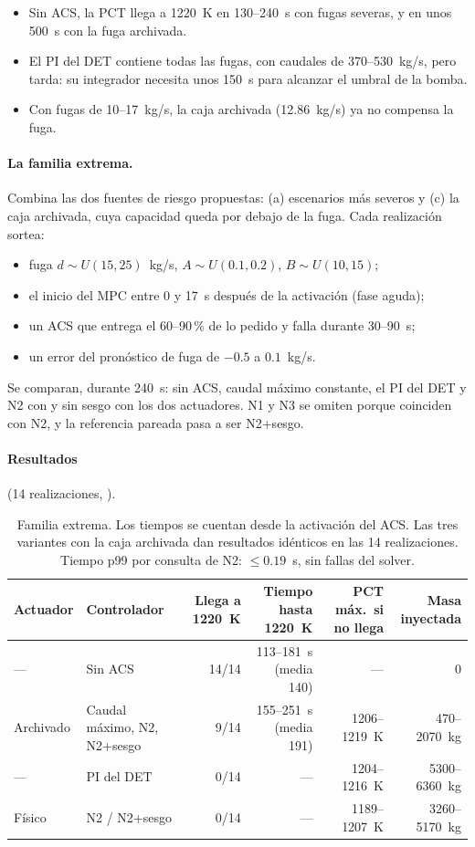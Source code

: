 \begin{itemize}
  \item Sin ACS, la PCT llega a 1220~K en 130--240~s con fugas severas, y en unos 500~s con
        la fuga archivada.
  \item El PI del DET contiene todas las fugas, con caudales de 370--530~kg/s, pero tarda:
        su integrador necesita unos 150~s para alcanzar el umbral de la bomba.
  \item Con fugas de 10--17~kg/s, la caja archivada (12.86~kg/s) ya no compensa la fuga.
\end{itemize}

\paragraph{La familia extrema.} Combina las dos fuentes de riesgo propuestas: (a)
escenarios más severos y (c) la caja archivada, cuya capacidad queda por debajo de la fuga.
Cada realización sortea:
\begin{itemize}
  \item fuga $d\sim U(15,25)$~kg/s, $A\sim U(0.1,0.2)$, $B\sim U(10,15)$;
  \item el inicio del MPC entre 0 y 17~s después de la activación (fase aguda);
  \item un ACS que entrega el 60--90\,\% de lo pedido y falla durante 30--90~s;
  \item un error del pronóstico de fuga de $-0.5$ a $0.1$~kg/s.
\end{itemize}
Se comparan, durante 240~s: sin ACS, caudal máximo constante, el PI del DET y N2 con y sin
sesgo con los dos actuadores. N1 y N3 se omiten porque coinciden con N2, y la referencia
pareada pasa a ser N2+sesgo.

\paragraph{Resultados} (14 realizaciones, ).

\begin{table}[H]\centering\footnotesize\setlength{\tabcolsep}{4pt}
\begin{tabularx}{\linewidth}{@{}l Y r r r r@{}}\toprule
Actuador & Controlador & Llega a 1220~K & Tiempo hasta 1220~K & PCT máx.\ si no llega & Masa inyectada\\\midrule
--- & Sin ACS & 14/14 & 113--181~s (media 140) & --- & 0\\
Archivado & Caudal máximo, N2, N2+sesgo & 9/14 & 155--251~s (media 191) & 1206--1219~K & 470--2070~kg\\
--- & PI del DET & 0/14 & --- & 1204--1216~K & 5300--6360~kg\\
Físico & N2 / N2+sesgo & 0/14 & --- & 1189--1207~K & 3260--5170~kg\\\bottomrule
\end{tabularx}
\caption{Familia extrema. Los tiempos se cuentan desde la activación del ACS. Las tres
variantes con la caja archivada dan resultados idénticos en las 14 realizaciones. Tiempo p99
por consulta de N2: $\le0.19$~s, sin fallas del solver.}
\end{table}

